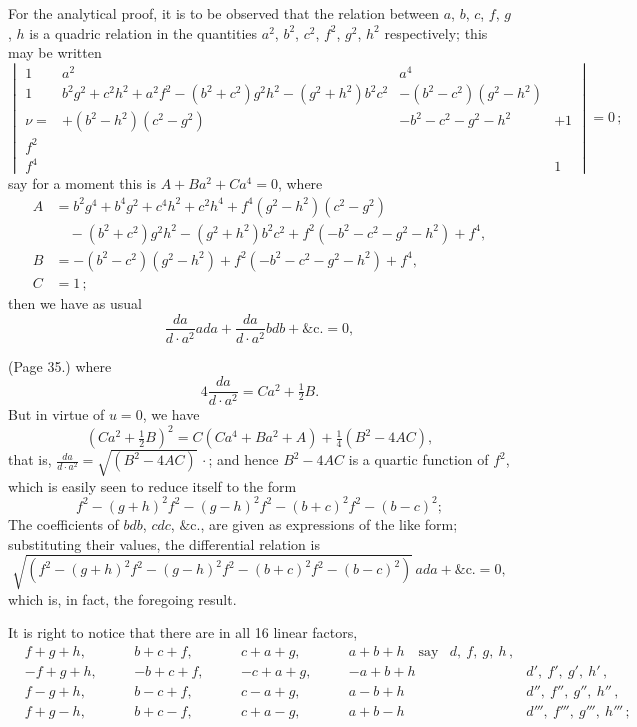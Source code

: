 \documentclass[11pt,a4paper]{article}
\begin{document}
For the analytical proof, it is to be observed that the relation between $a$, $b$, $c$, $f$, $g$, $h$ is a quadric relation in the quantities $a^2$, $b^2$, $c^2$, $f^2$, $g^2$, $h^2$ respectively; this may be written
\[
\begin{vmatrix}
1 & a^2 & a^4 \\
1 & b^2g^2 + c^2h^2 + a^2f^2 - (b^2 + c^2)g^2h^2 - (g^2 + h^2)b^2c^2 & -(b^2 - c^2)(g^2 - h^2) \\
\nu = & + (b^2 - h^2)(c^2 - g^2) & -b^2 - c^2 - g^2 - h^2 & +1 \\
f^2 & & & \\
f^4 & & & 1
\end{vmatrix} = 0\,;
\]
say for a moment this is $A + Ba^2 + Ca^4 = 0$, where
\begin{align*}
A &= b^2g^4 + b^4g^2 + c^4h^2 + c^2h^4 + f^4(g^2 - h^2)(c^2 - g^2) \\
&\quad - (b^2 + c^2)g^2h^2 - (g^2 + h^2)b^2c^2 + f^2(-b^2 - c^2 - g^2 - h^2) + f^4, \\
B &= -(b^2 - c^2)(g^2 - h^2) + f^2(-b^2 - c^2 - g^2 - h^2) + f^4, \\
C &= 1\,;
\end{align*}
then we have as usual
\[
\frac{da}{d \cdot a^2} a da + \frac{da}{d \cdot a^2} b db + \&\text{c.} = 0,
\]

\bigskip

\noindent (Page 35.) where
\[
4 \frac{da}{d \cdot a^2} = Ca^2 + \tfrac{1}{2} B.
\]
But in virtue of $u = 0$, we have
\[
(Ca^2 + \tfrac{1}{2} B)^2 = C(Ca^4 + Ba^2 + A) + \tfrac{1}{4} (B^2 - 4AC),
\]
that is, $\frac{da}{d \cdot a^2} = \sqrt{(B^2 - 4AC)} \, \cdot$; and hence $B^2 - 4AC$ is a quartic function of $f^2$, which is easily seen to reduce itself to the form
\[
f^2 - (g + h)^2 f^2 - (g - h)^2 f^2 - (b + c)^2 f^2 - (b - c)^2;
\]
The coefficients of $bdb$, $cdc$, $\&$c., are given as expressions of the like form; substituting their values, the differential relation is
\[
\sqrt{(f^2 - (g + h)^2 f^2 - (g - h)^2 f^2 - (b + c)^2 f^2 - (b - c)^2)} \, ada + \&\text{c.} = 0,
\]
which is, in fact, the foregoing result.

It is right to notice that there are in all 16 linear factors,
\begin{align*}
&f + g + h, &\quad &b + c + f, &\quad &c + a + g, &\quad &a + b + h \quad \text{say} & d,\ f,\ g,\ h\,, \\
&-f + g + h, &\quad &-b + c + f, &\quad &-c + a + g, &\quad &-a + b + h &\quad &d',\ f',\ g',\ h'\,, \\
&f - g + h, &\quad &b - c + f, &\quad &c - a + g, &\quad &a - b + h &\quad &d'',\ f'',\ g'',\ h''\,, \\
&f + g - h, &\quad &b + c - f, &\quad &c + a - g, &\quad &a + b - h &\quad &d''',\ f''',\ g''',\ h'''\,;
\end{align*}
\end{document}
